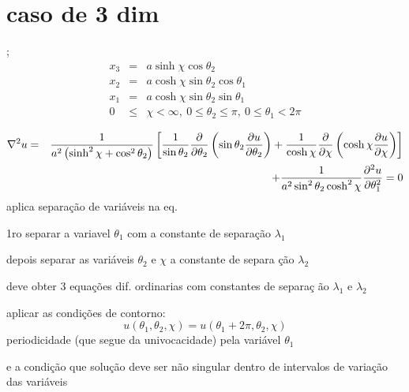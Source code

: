 \documentclass[a4paper,12pt]{article}
\begin{document}
\section{caso de 3 dim}

;%
\begin{eqnarray*}
x_{3} &=&a\sinh \chi \cos \theta _{2} \\
x_{2} &=&a\cosh \chi \sin \theta _{2}\cos \theta _{1} \\
x_{1} &=&a\cosh \chi \sin \theta _{2}\sin \theta _{1} \\
0 &\leq &\chi <\infty ,\ 0\leq \theta _{2}\leq \pi ,\ 0\leq \theta _{1}<2\pi
\end{eqnarray*}

\begin{eqnarray*}
\nabla ^{2}u &=&\frac{1}{a^{2}\left( \sinh ^{2}\chi +\cos ^{2}\theta
_{2}\right) }\left[ \frac{1}{\sin \theta _{2}}\frac{\partial }{\partial
\theta _{2}}\left( \sin \theta _{2}\frac{\partial u}{\partial \theta _{2}}%
\right) +\frac{1}{\cosh \chi }\frac{\partial }{\partial \chi }\left( \cosh
\chi \frac{\partial u}{\partial \chi }\right) \right] \\
&&+\frac{1}{a^{2}\sin ^{2}\theta _{2}\cosh ^{2}\chi }\frac{\partial ^{2}u}{%
\partial \theta _{1}^{2}}=0
\end{eqnarray*}%
aplica separa\c{c}\~{a}o de vari\'{a}veis na eq.

1ro separar a variavel $\theta _{1}$ com a constante de separa\c{c}\~{a}o $%
\lambda _{1}$

depois separar as vari\'{a}veis $\theta _{2}$ e $\chi $ a constante de separa%
\c{c}\~{a}o $\lambda _{2}$

deve obter 3 equa\c{c}\~{o}es dif. ordinarias com constantes de separa\c{c}%
\~{a}o $\lambda _{1}$ e $\lambda _{2}$

aplicar as condi\c{c}\~{o}es de contorno: 
\begin{equation*}
u\left( \theta _{1},\theta _{2},\chi \right) =u\left( \theta _{1}+2\pi
,\theta _{2},\chi \right)
\end{equation*}%
periodicidade (que segue da univocacidade) pela vari\'{a}vel $\theta _{1}$

e a condi\c{c}\~{a}o que solu\c{c}\~{a}o deve ser n\~{a}o singular dentro de
intervalos de varia\c{c}\~{a}o das vari\'{a}veis
\end{document}
